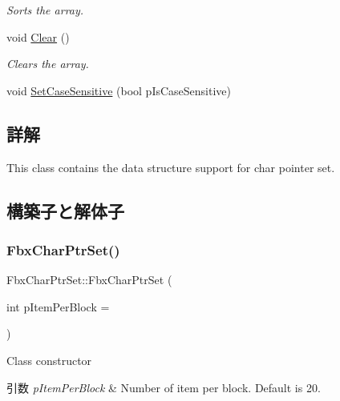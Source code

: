 \begin{DoxyCompactItemize}
$$\begin{DoxyCompactList}\small\item\em Sorts the array. \end{DoxyCompactList}\item 
void \hyperlink{class_fbx_char_ptr_set_a868b8f961a3e3f5d4c4c5f77009e5947}{Clear} ()
\begin{DoxyCompactList}\small\item\em Clears the array. \end{DoxyCompactList}\item 
void \hyperlink{class_fbx_char_ptr_set_ad7da280af4a52c6b7aa3037fd7636f6f}{Set\+Case\+Sensitive} (bool p\+Is\+Case\+Sensitive)
\end{DoxyCompactItemize}


\subsection{詳解}
This class contains the data structure support for char pointer set. 

\subsection{構築子と解体子}
\mbox{\label{class_fbx_char_ptr_set_a7f12f3a80a0e523ecb890aaa093c2aad}} 
\subsubsection{\texorpdfstring{Fbx\+Char\+Ptr\+Set()}{FbxCharPtrSet()}}
{\footnotesize\ttfamily Fbx\+Char\+Ptr\+Set\+::\+Fbx\+Char\+Ptr\+Set (\begin{DoxyParamCaption}\item[{int}]{p\+Item\+Per\+Block = {} }\end{DoxyParamCaption})}

Class constructor 
\begin{DoxyParams}{引数}
{\em p\+Item\+Per\+Block} & Number of item per block. Default is 20. \\
\hline
\end{DoxyParams}
\mbox{\label{class_fbx_char_ptr_set_adbdbfd04a21ccc2d880de34d74f96771}} 
